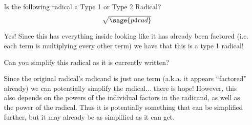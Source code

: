 \documentclass{ximera}
\begin{document}
\begin{problem}
    Is the following radical a Type 1 or Type 2 Radical?
    \[
        \sqrt{\sage{p4rad}}
    \]
    
    \begin{multipleChoice}
    \end{multipleChoice}
    \begin{feedback}[correct]
        Yes! Since this has everything inside looking like it has already been factored (i.e. each term is multiplying every other term) we have that this is a type 1 radical!
    \end{feedback}
        
    \begin{problem}
        Can you simplify this radical as it is currently written?
        \begin{multipleChoice}
        \end{multipleChoice}
        \begin{feedback}[correct]
            Since the original radical's radicand is just one term (a.k.a. it appears ``factored'' already) we can potentially simplify the radical... there is hope! However, this also depends on the powers of the individual factors in the radicand, as well as the power of the radical. Thus it is potentially something that can be simplified further, but it may already be as simplified as it can get. 
        \end{feedback}
    \end{problem}
\end{problem}
\end{document}

